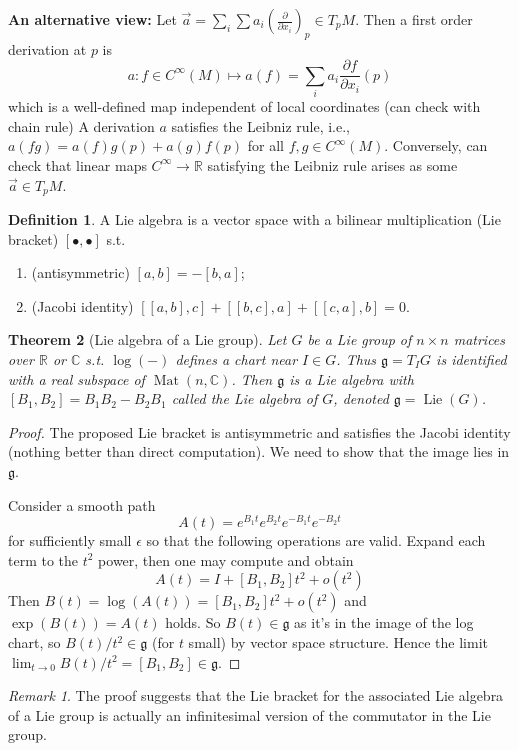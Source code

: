 \documentclass{article}
\theoremstyle{definition}
\newtheorem{defn}{Definition}[section]
\theoremstyle{remark}
\newtheorem{rem}{Remark}
\theoremstyle{plain}
\newtheorem{thm}[defn]{Theorem}
\newcommand{\RR}{\mathbb{R}}
\newcommand{\CC}{\mathbb{C}}
\begin{document}
\textbf{An alternative view:}
Let $\Vec{a}=\sum_i\sum a_i\left(\frac{\partial}{\partial x_i}\right)_p\in T_pM$. Then a first order derivation at $p$ is 
\[a:f\in C^\infty(M)\mapsto a(f)=\sum_ia_i\dfrac{\partial f}{\partial x_i}(p)\]
which is a well-defined map independent of local coordinates (can check with chain rule)
A derivation $a$ satisfies the Leibniz rule, i.e., $a(fg)=a(f)g(p)+a(g)f(p)$ for all $f,g\in C^\infty(M)$. Conversely, can check that linear maps $C^\infty\to\RR$ satisfying the Leibniz rule arises as some $\Vec{a}\in T_pM$.
\begin{defn}
    A Lie algebra is a vector space with a bilinear multiplication (Lie bracket) $[\bullet,\bullet]$ s.t.
    \begin{enumerate}
        \item (antisymmetric) $[a,b]=-[b,a]$;
        \item (Jacobi identity) $[[a,b],c]+[[b,c],a]+[[c,a],b]=0$.
    \end{enumerate}
\end{defn}
\begin{thm}[Lie algebra of a Lie group]
    Let $G$ be a Lie group of $n\times n$ matrices over $\RR$ or $\CC$ s.t. $\log(-)$ defines a chart near $I\in G$. Thus $\mathfrak{g}=T_IG$ is identified with a real subspace of $\operatorname{Mat}(n,\CC)$. Then $\mathfrak{g}$ is a Lie algebra with $[B_1,B_2]=B_1B_2-B_2B_1$ called the Lie algebra of $G$, denoted $\mathfrak{g}=\operatorname{Lie}(G)$.
\end{thm}
\begin{proof}
    The proposed Lie bracket is antisymmetric and satisfies the Jacobi identity (nothing better than direct computation). We need to show that the image lies in $\mathfrak{g}$.

    Consider a smooth path 
    \[A(t)=e^{B_1t}e^{B_2t}e^{-B_1t}e^{-B_2t}\]
    for sufficiently small $\epsilon$ so that the following operations are valid.
    Expand each term to the $t^2$ power, then one may compute and obtain
    \[A(t)=I+[B_1,B_2]t^2+o(t^2)\]
    Then $B(t)=\log(A(t))=[B_1,B_2]t^2+o(t^2)$ and $\exp(B(t))=A(t)$ holds. So $B(t)\in\mathfrak{g}$ as it's in the image of the log chart, so $B(t)/t^2\in\mathfrak{g}$ (for $t$ small) by vector space structure. Hence the limit $\lim_{t\to 0}B(t)/t^2=[B_1,B_2]\in\mathfrak{g}$.
\end{proof}
\begin{rem}
    The proof suggests that the Lie bracket for the associated Lie algebra of a Lie group is actually an infinitesimal version of the commutator in the Lie group. 
\end{rem}
\end{document}
